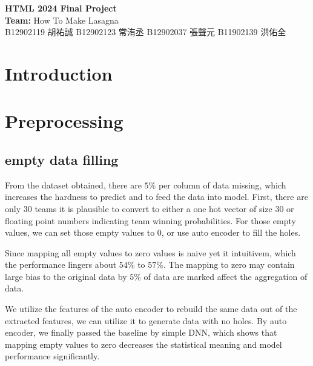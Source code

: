 \documentclass[10pt,a4paper]{article}
\begin{document}
\begin{center}
  {\LARGE \bf HTML 2024 Final Project}\\[8pt]
  \textbf{Team:} How To Make Lasagna\\
  B12902119 胡祐誠
  B12902123 常洧丞
  B12902037 張聲元
  B11902139 洪佑全
\end{center}


\section{Introduction}


\section{Preprocessing}
\subsection{empty data filling}
From the dataset obtained, there are $5\%$ per column of data missing, which increases the hardness to predict and to feed the data into model.
First, there are only $30$ teams it is plausible to convert to either a one hot vector of size $30$ or floating point numbers indicating team winning probabilities.
For those empty values, we can set those empty values to $0$, or use auto encoder to fill the holes.

Since mapping all empty values to zero values is naive yet it intuitivem, which the performance lingers about $54\%$ to $57\%$.
The mapping to zero may contain large bias to the original data by $5\%$ of data are marked affect the aggregation of data.

We utilize the features of the auto encoder to rebuild the same data out of the extracted features, we can utilize it to generate data with no holes.
By auto encoder, we finally passed the baseline by simple DNN, which shows that mapping empty values to zero decreases the statistical meaning and model performance significantly.
\end{document}
